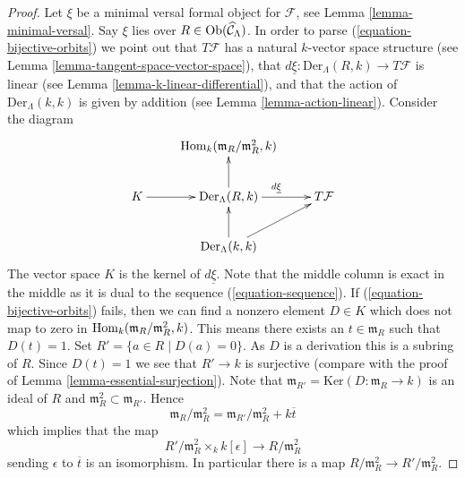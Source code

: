 \begin{proof}
Let $\xi$ be a minimal versal formal object for $\mathcal{F}$, see
Lemma \ref{lemma-minimal-versal}.
Say $\xi$ lies over $R \in \mathop{\rm Ob}\nolimits(\widehat{\mathcal{C}}_\Lambda)$.
In order to parse (\ref{equation-bijective-orbits}) we point out
that $T\mathcal{F}$ has a natural $k$-vector space structure
(see
Lemma \ref{lemma-tangent-space-vector-space}),
that $d\underline{\xi} : \text{Der}_\Lambda(R, k) \to T\mathcal{F}$
is linear (see
Lemma \ref{lemma-k-linear-differential}),
and that the action of $\text{Der}_\Lambda(k, k)$ is
given by addition (see
Lemma \ref{lemma-action-linear}).
Consider the diagram
$$
\xymatrix{
& \Hom_k(\mathfrak m_R/\mathfrak m_R^2, k) \\
K \ar[r] & \text{Der}_\Lambda(R, k) \ar[r]^{d\underline{\xi}} \ar[u] &
T\mathcal{F} \\
& \text{Der}_\Lambda(k, k) \ar[u] \ar[ru]
}
$$
The vector space $K$ is the kernel of $d\underline{\xi}$.
Note that the middle column is exact in the middle as it is dual to the
sequence (\ref{equation-sequence}). If (\ref{equation-bijective-orbits})
fails, then we can find a nonzero element $D \in K$ which
does not map to zero in $\mathop{\rm Hom}\nolimits_k(\mathfrak m_R/\mathfrak m_R^2, k)$.
This means there exists an $t \in \mathfrak m_R$ such that
$D(t) = 1$. Set $R' = \{a \in R \mid D(a) = 0\}$. As $D$ is a derivation
this is a subring of $R$. Since $D(t) = 1$ we see that $R' \to k$
is surjective (compare with the proof of
Lemma \ref{lemma-essential-surjection}).
Note that $\mathfrak m_{R'} = \text{Ker}(D : \mathfrak m_R \to k)$
is an ideal of $R$ and $\mathfrak m_R^2 \subset \mathfrak m_{R'}$. Hence
$$
\mathfrak m_R/\mathfrak m_R^2 =
\mathfrak m_{R'}/\mathfrak m_R^2 + k\overline{t}
$$
which implies that the map
$$
R'/\mathfrak m_R^2 \times_k k[\epsilon] \to R/\mathfrak m_R^2
$$
sending $\epsilon$ to $\overline{t}$ is an isomorphism. In particular
there is a map $R/\mathfrak m_R^2 \to R'/\mathfrak m_R^2$.


\end{proof}
